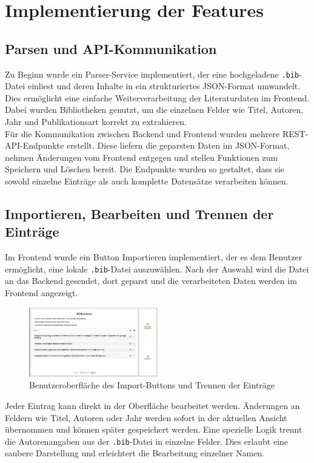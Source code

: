 \section{Implementierung der Features}

\subsection{Parsen und API-Kommunikation}
Zu Beginn wurde ein Parser-Service implementiert, der eine hochgeladene \texttt{.bib}-Datei einliest 
und deren Inhalte in ein strukturiertes JSON-Format umwandelt. Dies ermöglicht eine einfache Weiterverarbeitung 
der Literaturdaten im Frontend. Dabei wurden Bibliotheken genutzt, um die einzelnen Felder wie Titel, Autoren, Jahr
und Publikationsart korrekt zu extrahieren.\\

\noindent Für die Kommunikation zwischen Backend und Frontend wurden mehrere REST-API-Endpunkte erstellt.
Diese liefern die geparsten Daten im JSON-Format, nehmen Änderungen vom Frontend entgegen und
stellen Funktionen zum Speichern und Löschen bereit. Die Endpunkte wurden so gestaltet, dass sie sowohl
einzelne Einträge als auch komplette Datensätze verarbeiten können.

\subsection{Importieren, Bearbeiten und Trennen der Einträge}
Im Frontend wurde ein Button \glqq Importieren\grqq{} implementiert, der es dem Benutzer ermöglicht,
eine lokale \texttt{.bib}-Datei auszuwählen. Nach der Auswahl wird die Datei an das Backend gesendet, 
dort geparst und die verarbeiteten Daten werden im Frontend angezeigt.

\begin{figure}[h]
    \centering
    \includegraphics[width=0.5\textwidth]{Graphics/front.png}
    \caption{Benutzeroberfläche des Import-Buttons und Trennen der Einträge}
    \label{fig:importieren}
\end{figure}

\noindent Jeder Eintrag kann direkt in der Oberfläche bearbeitet werden. Änderungen an Feldern wie Titel,
Autoren oder Jahr werden sofort in der aktuellen Ansicht übernommen und können später gespeichert werden.
Eine spezielle Logik trennt die Autorenangaben aus der \texttt{.bib}-Datei in einzelne Felder.
Dies erlaubt eine saubere Darstellung und erleichtert die Bearbeitung einzelner Namen.

